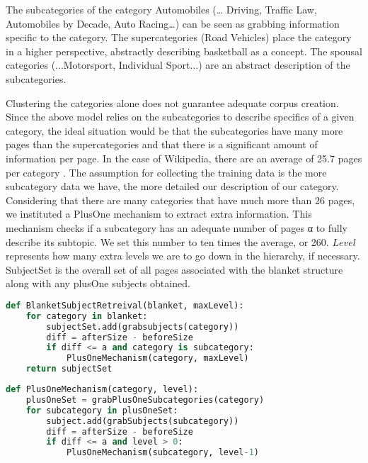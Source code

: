 The subcategories of the category Automobiles (… Driving, Traffic Law,
Automobiles by Decade, Auto Racing…) can be seen as grabbing
information specific to the category. The supercategories (Road
Vehicles) place the category in a higher perspective, abstractly
describing basketball as a concept. The spousal categories
(...Motorsport, Individual Sport...) are an abstract description of
the subcategories.


Clustering the categories alone does not guarantee adequate corpus
creation. Since the above model relies on the subcategories to
describe specifics of a given category, the ideal situation would be
that the subcategories have many more pages than the supercategories
and that there is a significant amount of information per page.  In
the case of Wikipedia, there are an average of 25.7 pages per category
\cite{1321474}. The assumption for collecting the training data is the
more subcategory data we have, the more detailed our description of
our category. Considering that there are many categories that have
much more than 26 pages, we instituted a PlusOne mechanism to extract
extra information. This mechanism checks if a subcategory has an
adequate number of pages α to fully describe its subtopic. We set this
number to ten times the average, or 260. $Level$ represents how many
extra levels we are to go down in the hierarchy, if
necessary. SubjectSet is the overall set of all pages associated with
the blanket structure along with any plusOne subjects obtained.

\begin{lstlisting}[language=Python,frame=none,tabsize=2,caption=BlanketSubjectRetreival,label=BlanketSubjectRetreival,basicstyle=\small]
def BlanketSubjectRetreival(blanket, maxLevel):
	for category in blanket:
		subjectSet.add(grabsubjects(category))
		diff = afterSize - beforeSize
		if diff <= a and category is subcategory:
			PlusOneMechanism(category, maxLevel)
	return subjectSet
\end{lstlisting}

\begin{lstlisting}[language=Python,frame=none,tabsize=2,caption=PlusOneMechanism, label=PlusOneMechanism,basicstyle=\small]
def PlusOneMechanism(category, level):
	plusOneSet = grabPlusOneSubcategories(category)
	for subcategory in plusOneSet:
		subject.add(grabSubjects(subcategory))
		diff = afterSize - beforeSize
		if diff <= a and level > 0:
			PlusOneMechanism(subcategory, level-1)


\end{lstlisting}


